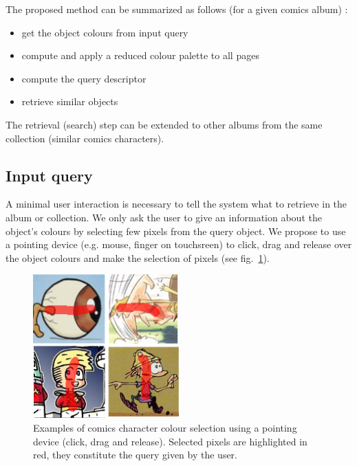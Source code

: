 The proposed method can be summarized as follows (for a given comics album) :
\begin{itemize}
  \item get the object colours from input query
  \item compute and apply a reduced colour palette to all pages
  \item compute the query descriptor
  \item retrieve similar objects
\end{itemize}

The retrieval (search) step can be extended to other albums from the same collection (similar comics characters).
 

\subsection{Input query}
\label{sec:in:input_query}
A minimal user interaction is necessary to tell the system what to retrieve in the album or collection. We only ask the user to give an information about the object's colours by selecting few pixels from the query object. We propose to use a pointing device (e.g. mouse, finger on touchsreen) to click, drag and release over the object colours and make the selection of pixels (see fig.~\ref{fig:in:user_selection}).

 \begin{figure}[!ht]	%
 	 \centering
 	\includegraphics[width=0.5\textwidth]{user_selection.png}
 	\caption[User defined comics character selection]{Examples of comics character colour selection using a pointing device (click, drag and release). Selected pixels are highlighted in red, they constitute the query given by the user.}
 	\label{fig:in:user_selection}
 \end{figure}


